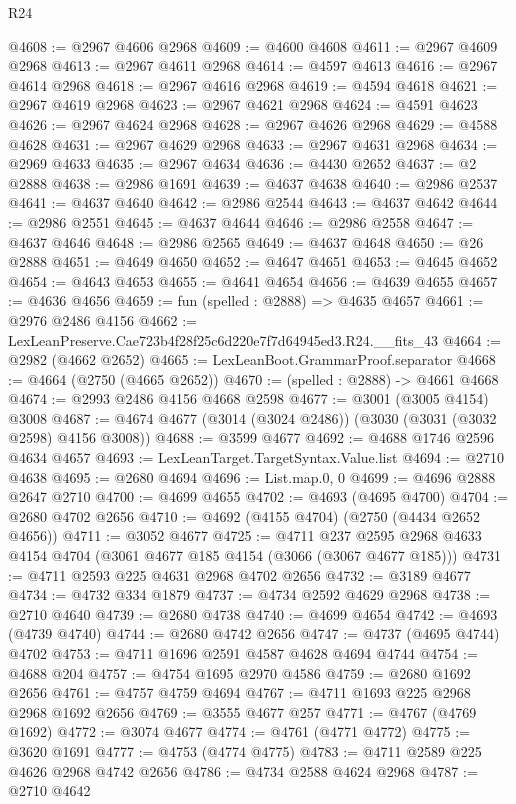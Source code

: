 \begin{lexlean}{R24}
\begin{coremodule}
@4608 := @2967 @4606 @2968
@4609 := @4600 @4608
@4611 := @2967 @4609 @2968
@4613 := @2967 @4611 @2968
@4614 := @4597 @4613
@4616 := @2967 @4614 @2968
@4618 := @2967 @4616 @2968
@4619 := @4594 @4618
@4621 := @2967 @4619 @2968
@4623 := @2967 @4621 @2968
@4624 := @4591 @4623
@4626 := @2967 @4624 @2968
@4628 := @2967 @4626 @2968
@4629 := @4588 @4628
@4631 := @2967 @4629 @2968
@4633 := @2967 @4631 @2968
@4634 := @2969 @4633
@4635 := @2967 @4634
@4636 := @4430 @2652
@4637 := @2 @2888
@4638 := @2986 @1691
@4639 := @4637 @4638
@4640 := @2986 @2537
@4641 := @4637 @4640
@4642 := @2986 @2544
@4643 := @4637 @4642
@4644 := @2986 @2551
@4645 := @4637 @4644
@4646 := @2986 @2558
@4647 := @4637 @4646
@4648 := @2986 @2565
@4649 := @4637 @4648
@4650 := @26 @2888
@4651 := @4649 @4650
@4652 := @4647 @4651
@4653 := @4645 @4652
@4654 := @4643 @4653
@4655 := @4641 @4654
@4656 := @4639 @4655
@4657 := @4636 @4656
@4659 := fun (spelled : @2888) => @4635 @4657
@4661 := @2976 @2486 @4156
@4662 := LexLeanPreserve.Cae723b4f28f25c6d220e7f7d64945ed3.R24.__fits_43
@4664 := @2982 (@4662 @2652)
@4665 := LexLeanBoot.GrammarProof.separator
@4668 := @4664 (@2750 (@4665 @2652))
@4670 := (spelled : @2888) -> @4661 @4668
@4674 := @2993 @2486 @4156 @4668 @2598
@4677 := @3001 (@3005 @4154) @3008
@4687 := @4674 @4677 (@3014 (@3024 @2486)) (@3030 (@3031 (@3032 @2598) @4156 @3008))
@4688 := @3599 @4677
@4692 := @4688 @1746 @2596 @4634 @4657
@4693 := LexLeanTarget.TargetSyntax.Value.list
@4694 := @2710 @4638
@4695 := @2680 @4694
@4696 := List.map.{0, 0}
@4699 := @4696 @2888 @2647 @2710
@4700 := @4699 @4655
@4702 := @4693 (@4695 @4700)
@4704 := @2680 @4702 @2656
@4710 := @4692 (@4155 @4704) (@2750 (@4434 @2652 @4656))
@4711 := @3052 @4677
@4725 := @4711
    @237
    @2595
    @2968
    @4633
    @4154
    @4704
    (@3061 @4677 @185 @4154 (@3066 (@3067 @4677 @185)))
@4731 := @4711 @2593 @225 @4631 @2968 @4702 @2656
@4732 := @3189 @4677
@4734 := @4732 @334 @1879
@4737 := @4734 @2592 @4629 @2968
@4738 := @2710 @4640
@4739 := @2680 @4738
@4740 := @4699 @4654
@4742 := @4693 (@4739 @4740)
@4744 := @2680 @4742 @2656
@4747 := @4737 (@4695 @4744) @4702
@4753 := @4711 @1696 @2591 @4587 @4628 @4694 @4744
@4754 := @4688 @204
@4757 := @4754 @1695 @2970 @4586
@4759 := @2680 @1692 @2656
@4761 := @4757 @4759 @4694
@4767 := @4711 @1693 @225 @2968 @2968 @1692 @2656
@4769 := @3555 @4677 @257
@4771 := @4767 (@4769 @1692)
@4772 := @3074 @4677
@4774 := @4761 (@4771 @4772)
@4775 := @3620 @1691
@4777 := @4753 (@4774 @4775)
@4783 := @4711 @2589 @225 @4626 @2968 @4742 @2656
@4786 := @4734 @2588 @4624 @2968
@4787 := @2710 @4642

\end{coremodule}
\end{lexlean}
